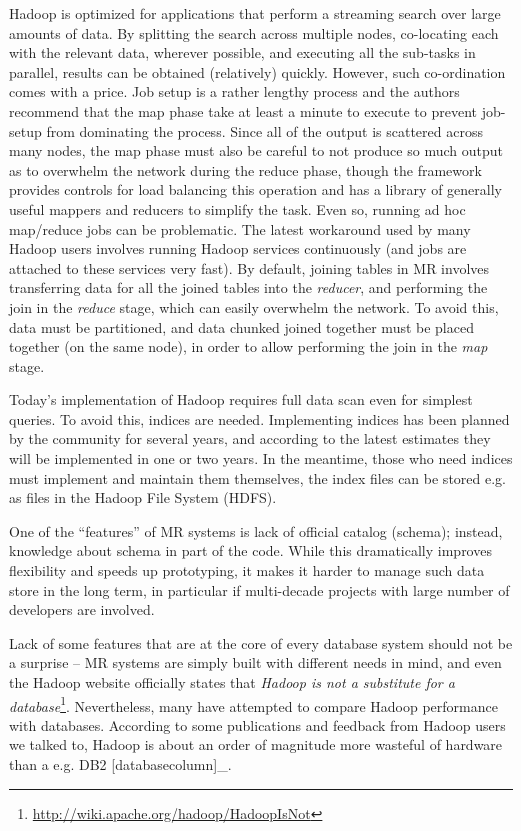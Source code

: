 \documentclass[DM,lsstdraft,toc]{lsstdoc}
\begin{document}
Hadoop is optimized for applications that perform a streaming search
over large amounts of data. By splitting the search across multiple
nodes, co-locating each with the relevant data, wherever possible, and
executing all the sub-tasks in parallel, results can be obtained
(relatively) quickly. However, such co-ordination comes with a price.
Job setup is a rather lengthy process and the authors recommend that the
map phase take at least a minute to execute to prevent job-setup from
dominating the process. Since all of the output is scattered across many
nodes, the map phase must also be careful to not produce so much output
as to overwhelm the network during the reduce phase, though the
framework provides controls for load balancing this operation and has a
library of generally useful mappers and reducers to simplify the task.
Even so, running ad hoc map/reduce jobs can be problematic. The latest
workaround used by many Hadoop users involves running Hadoop services
continuously (and jobs are attached to these services very fast). By
default, joining tables in MR involves transferring data for all the
joined tables into the \emph{reducer}, and performing the join in the
\emph{reduce} stage, which can easily overwhelm the network. To avoid
this, data must be partitioned, and data chunked joined together must be
placed together (on the same node), in order to allow performing the
join in the \emph{map} stage.

Today's implementation of Hadoop requires full data scan even for
simplest queries. To avoid this, indices are needed. Implementing
indices has been planned by the community for several years, and
according to the latest estimates they will be implemented in one or two
years. In the meantime, those who need indices must implement and
maintain them themselves, the index files can be stored e.g. as files in
the Hadoop File System (HDFS).

One of the ``features'' of MR systems is lack of official catalog
(schema); instead, knowledge about schema in part of the code. While
this dramatically improves flexibility and speeds up prototyping, it
makes it harder to manage such data store in the long term, in
particular if multi-decade projects with large number of developers are
involved.

Lack of some features that are at the core of every database system
should not be a surprise -- MR systems are simply built with different
needs in mind, and even
the Hadoop website
officially states that \emph{Hadoop is not a substitute for a
database}\footnote{\url{http://wiki.apache.org/hadoop/HadoopIsNot}}. Nevertheless, many have attempted to compare Hadoop
performance with databases. According to some publications and feedback
from Hadoop users we talked to, Hadoop is about an order of magnitude
more wasteful of hardware than a e.g. DB2 {[}databasecolumn{]}\_.
\end{document}
